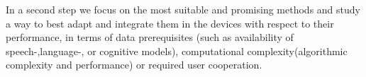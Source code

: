 \documentclass[12pt,a4paper,oneside,onecolumn]{article}
\begin{document}
In a second step we focus on the most suitable and promising methods and study a way to best adapt and integrate them in the devices with respect to their performance, in terms of data prerequisites (such as availability of speech-,language-, or cognitive models), computational complexity(algorithmic complexity and performance) or required user cooperation.






%

\clearpage 
\appendix




\printindex
\end{document}
